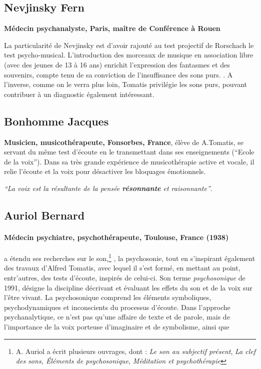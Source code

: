 \subsection{ Nevjinsky Fern}
\textbf{Médecin psychanalyste,
  Paris, maître de Conférence à Rouen}

 La particularité de Nevjinsky est d'avoir rajouté au test projectif de Rorschach le test psycho-musical.
L'introduction des morceaux de musique en association libre (avec
 des jeunes de 13 à 16 ans) enrichit l'expression des fantasmes et des
 souvenirs, compte tenu de sa conviction de l'insuffisance des sons purs.
 \autocite{nevjinsky:adolescence}.
A l'inverse, comme on le verra plus loin, Tomatis
privilégie les sons purs,  pouvant contribuer à un diagnostic également intéressant.



  \subsection{ Bonhomme Jacques }
  \textbf{Musicien, musicothérapeute,
    Fonsorbes, France}, élève de A.Tomatis, se servant du même test
  d'écoute en le transmettant dans ses enseignements (``Ecole de la
  voix''). Dans sa très grande expérience de musicothérapie active et
  vocale, il relie l'écoute et la voix pour désactiver les bloquages
  émotionnels.

  \textit{``La voix est la
      résultante de la pensée \textbf{résonnante}  et raisonnante''}. \autocite{bonhomme-key}
      \subsection{Auriol Bernard}

\paragraph{Médecin psychiatre,
   psychothérapeute, Toulouse, France (1938)}
a étendu ses recherches sur le son,\footnote{ A. Auriol a écrit plusieurs ouvrages, dont : \textsl{Le son au subjectif présent}, \textsl{La clef des sons, Éléments de psychosonique}, \textsl{Méditation et
  psychothérapie}} \autocite{auriol_stress}, la psychosonie,
tout en s'inspirant également des
travaux d'Alfred Tomatis, avec lequel il s'est formé, en mettant au
point, entr'autres, des tests
d'écoute, inspirés de celui-ci.
Son terme \emph{psychosonique} de 1991,
désigne la discipline décrivant et évaluant les effets du
son et de la voix sur l'être vivant.
La psychosonique comprend les éléments
symboliques, psychodynamiques et inconscients du processus
d'écoute.
Dans l'approche  psychanalytique, ce n'est pas qu'une affaire de
texte et de parole, mais de l'importance de la voix porteuse
d'imaginaire et de symbolisme, ainsi que

